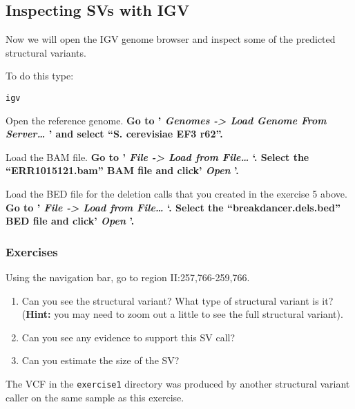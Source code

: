 \documentclass[11pt]{article}
\makeatletter
\newcommand{\boxspacing}{\kern\kvtcb@left@rule\kern\kvtcb@boxsep}
\newcommand{\prompt}[4]{
        {\ttfamily\llap{{\color{#2}[#3]:\hspace{3pt}#4}}\vspace{-\baselineskip}}
    }
\makeatother
\begin{document}
    \hypertarget{inspecting-svs-with-igv}{%
\subsection{Inspecting SVs with IGV}\label{inspecting-svs-with-igv}}

Now we will open the IGV genome browser and inspect some of the
predicted structural variants.

To do this type:

    \begin{tcolorbox}[breakable, size=fbox, boxrule=1pt, pad at break*=1mm,colback=cellbackground, colframe=cellborder]
\prompt{In}{incolor}{ }{\boxspacing}
\begin{Verbatim}[commandchars=\\\{\}]
igv
\end{Verbatim}
\end{tcolorbox}

    Open the reference genome. \textbf{Go to ' \textit{Genomes -\textgreater{}
Load Genome From Server\ldots{}} ' and select ``S. cerevisiae EF3
r62''.}

Load the BAM file. \textbf{Go to ' \textit{File -\textgreater{} Load from
File\ldots{}} `. Select the ``ERR1015121.bam'' BAM file and click'
\textit{Open} '.}

Load the BED file for the deletion calls that you created in the
exercise 5 above. \textbf{Go to ' \textit{File -\textgreater{} Load from
File\ldots{}} `. Select the ``breakdancer.dels.bed'' BED file and click'
\textit{Open} '.}

\hypertarget{exercises}{%
\subsubsection{Exercises}\label{exercises}}

Using the navigation bar, go to region II:257,766-259,766.

\begin{enumerate}
\def\labelenumi{\arabic{enumi}.}
\item
  Can you see the structural variant? What type of structural variant is
  it? (\textbf{Hint:} you may need to zoom out a little to see the full
  structural variant).
\item
  Can you see any evidence to support this SV call?
\item
  Can you estimate the size of the SV?
\end{enumerate}

The VCF in the \texttt{exercise1} directory was produced by another
structural variant caller on the same sample as this exercise.
\end{document}
